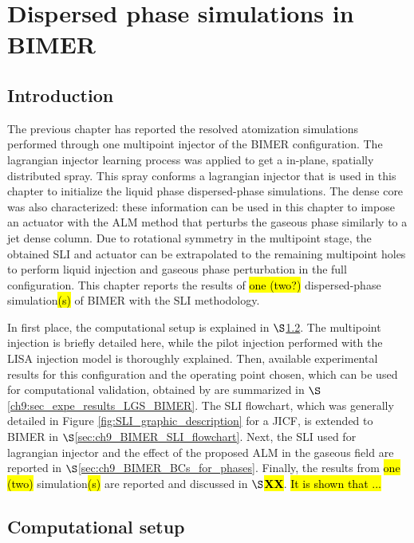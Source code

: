 \chapter{Dispersed phase simulations in BIMER}
	\label{ch9:BIMER_lagrangian}

\section{Introduction}

The previous chapter has reported the resolved atomization simulations performed through one multipoint injector of the BIMER configuration. The lagrangian injector learning process was applied to get a in-plane, spatially distributed spray. This spray conforms a lagrangian injector that is used in this chapter to initialize the liquid phase dispersed-phase simulations. The dense core was also characterized: these information can be used in this chapter to impose an actuator with the ALM method that perturbs the gaseous phase similarly to a jet dense column. Due to rotational symmetry in the multipoint stage, the obtained SLI and actuator can be extrapolated to the remaining multipoint holes to perform liquid injection and gaseous phase perturbation in the full configuration. This chapter reports the results of \hl{one (two?)} dispersed-phase simulation\hl{(s)} of BIMER with the SLI methodology.

In first place, the computational setup is explained in $\S$\ref{ch9:sec_computations_setup}. The multipoint injection is briefly detailed here, while the pilot injection performed with the LISA injection model is thoroughly explained. Then, available experimental results for this configuration and the operating point chosen, which can be used for computational validation, obtained by  are summarized in $\S$\ref{ch9:sec_expe_results_LGS_BIMER}. The SLI flowchart, which was generally detailed in Figure \ref{fig:SLI_graphic_description} for a JICF, is extended to BIMER in $\S$\ref{sec:ch9_BIMER_SLI_flowchart}. Next, the SLI used for lagrangian injector and the effect of the proposed ALM in the gaseous field are reported in $\S$\ref{sec:ch9_BIMER_BCs_for_phases}. Finally, the results from \hl{one (two)}  simulation\hl{(s)} are reported and discussed in $\S$\hl{\textbf{XX}}. \hl{It is shown that ...}





\section{Computational setup}
\label{ch9:sec_computations_setup}


